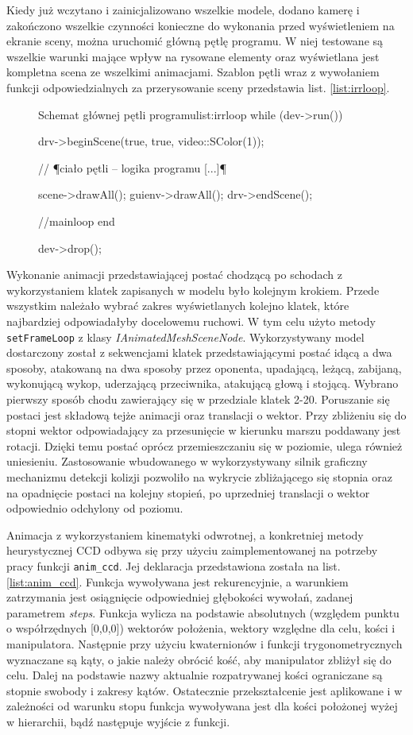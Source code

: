 \documentclass[11pt]{mwrep}
\begin{document}
Kiedy już wczytano i zainicjalizowano wszelkie modele, dodano kamerę i zakończono wszelkie czynności konieczne do wykonania przed wyświetleniem na ekranie sceny, można uruchomić główną pętlę programu. W niej testowane są wszelkie warunki mające wpływ na rysowane elementy oraz wyświetlana jest kompletna scena ze wszelkimi animacjami. Szablon pętli wraz z wywołaniem funkcji odpowiedzialnych za przerysowanie sceny przedstawia list. \ref{list:irrloop}.

\begin{figure}
\begin{listing}{Schemat głównej pętli programu}{list:irrloop}
	while (dev->run()) {
		drv->beginScene(true, true, video::SColor(1));

		// ¶ciało pętli -- logika programu [...]¶

		scene->drawAll();
		guienv->drawAll();
		drv->endScene();
	} //mainloop end

	dev->drop();

\end{listing}
\end{figure}

Wykonanie animacji przedstawiającej postać chodzącą po schodach z wykorzystaniem klatek zapisanych w modelu było kolejnym krokiem. Przede wszystkim należało wybrać zakres wyświetlanych kolejno klatek, które najbardziej odpowiadałyby docelowemu ruchowi. W tym celu użyto metody \texttt{setFrameLoop} z klasy \textit{IAnimatedMeshSceneNode}. Wykorzystywany model dostarczony został z sekwencjami klatek przedstawiającymi postać idącą a dwa sposoby, atakowaną na dwa sposoby przez oponenta, upadającą, leżącą, zabijaną, wykonującą wykop, uderzającą przeciwnika, atakującą głową i stojącą. Wybrano pierwszy sposób chodu zawierający się w przedziale klatek 2-20. Poruszanie się postaci jest składową tejże animacji oraz translacji o wektor. Przy zbliżeniu się do stopni wektor odpowiadający za przesunięcie w kierunku marszu poddawany jest rotacji. Dzięki temu postać oprócz przemieszczaniu się w poziomie, ulega również uniesieniu. Zastosowanie wbudowanego w wykorzystywany silnik graficzny mechanizmu detekcji kolizji pozwoliło na wykrycie zbliżającego się stopnia oraz na opadnięcie postaci na kolejny stopień, po uprzedniej translacji o wektor odpowiednio odchylony od poziomu.

Animacja z wykorzystaniem kinematyki odwrotnej, a konkretniej metody heurystycznej CCD odbywa się przy użyciu zaimplementowanej na potrzeby pracy funkcji \texttt{anim\_ccd}. Jej deklaracja przedstawiona została na list. \ref{list:anim_ccd}. Funkcja wywoływana jest rekurencyjnie, a warunkiem zatrzymania jest osiągnięcie odpowiedniej głębokości wywołań, zadanej parametrem \textit{steps}. Funkcja wylicza na podstawie absolutnych (względem punktu o współrzędnych [0,0,0]) wektorów położenia, wektory względne dla celu, kości i manipulatora. Następnie przy użyciu kwaternionów i funkcji trygonometrycznych wyznaczane są kąty, o jakie należy obrócić kość, aby manipulator zbliżył się do celu. Dalej na podstawie nazwy aktualnie rozpatrywanej kości ograniczane są stopnie swobody i zakresy kątów. Ostatecznie przekształcenie jest aplikowane i w zależności od warunku stopu funkcja wywoływana jest dla kości położonej wyżej w hierarchii, bądź następuje wyjście z funkcji.
\end{document}

